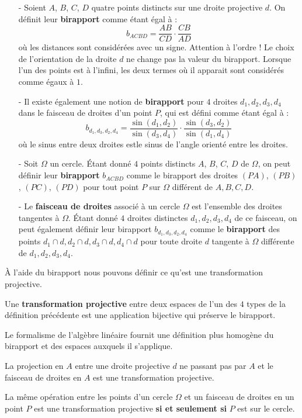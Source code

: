 \begin{dfn}
\begin{itemize}
\item[-] Soient $A$, $B$, $C$, $D$ quatre points distincts sur une droite projective $d$. On définit leur \textbf{birapport} comme étant égal à :
$$b_{ACBD} = \frac{AB}{CD} \cdot \frac{CB}{AD}$$
où les distances sont considérées avec un signe. Attention à l'ordre ! Le choix de l'orientation de la droite $d$ ne change pas la valeur du birapport. Lorsque l'un des points est à l'infini, les deux termes où il apparait sont considérés comme égaux à $1$.
\item[-] Il existe également une notion de \textbf{birapport} pour $4$ droites $d_1, d_2, d_3, d_4$ dans le faisceau de droites d'un point $P$, qui est défini comme étant égal à :
$$b_{d_1, d_3, d_2, d_4} = \frac{\sin(d_1, d_2)}{\sin(d_3, d_4)}\cdot\frac{\sin(d_3, d_2)}{\sin(d_1, d_4)}$$
où le sinus entre deux droites estle sinus de l'angle orienté entre les droites.
\item[-] Soit $\Omega$ un cercle. Étant donné $4$ points distincts $A$, $B$, $C$, $D$ de $\Omega$, on peut définir leur \textbf{birapport} $b_{ACBD}$ comme le birapport des droites $(PA)$, $(PB)$, $(PC)$, $(PD)$ pour tout point $P$ sur $\Omega$ différent de $A, B, C, D$.
\item[-]Le \textbf{faisceau de droites} associé à un cercle $\Omega$ est l'ensemble des droites tangentes à $\Omega$. Étant donné $4$ droites distinctes $d_1, d_2, d_3, d_4$ de ce faisceau, on peut également définir leur birapport $b_{d_1, d_3, d_2, d_4}$ comme le \textbf{birapport} des points $d_1\cap d, d_2\cap d, d_3\cap d, d_4\cap d$ pour toute droite $d$ tangente à $\Omega$ différente de $d_1, d_2, d_3, d_4$.
\end{itemize}
\end{dfn}


À l'aide du birapport nous pouvons définir ce qu'est une transformation projective.


\begin{dfn}
Une \textbf{transformation projective} entre deux espaces de l'un des $4$ types de la définition précédente est une application bijective qui préserve le birapport.
\end{dfn}


Le formalisme de l'algèbre linéaire fournit une définition plus homogène du birapport et des espaces auxquels il s'applique.


\begin{pro}
La projection en $A$ entre une droite projective $d$ ne passant pas par $A$ et le faisceau de droites en $A$ est une transformation projective.

\smallskip

La même opération entre les points d'un cercle $\Omega$ et un faisceau de droites en un point $P$ est une transformation projective \textbf{si et seulement si} $P$ est sur le cercle.
\end{pro}
\medskip

